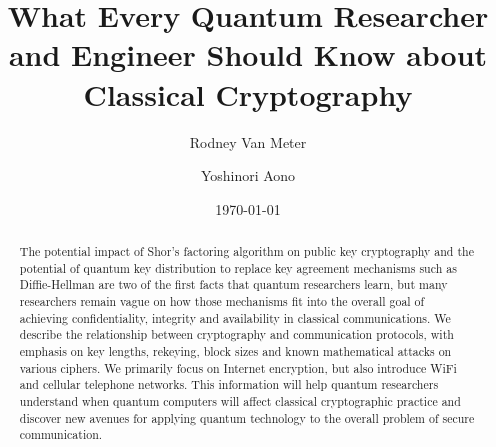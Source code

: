 \documentclass[%
 aip,
 jmp,%
 amsmath,amssymb,
 reprint,%
]{revtex4-1}
\def\comment#1{{\color{ForestGreen}$\Rightarrow${\small\em #1}}}
\begin{document}

\title[What Crypto]{What Every Quantum Researcher and Engineer Should Know about Classical Cryptography}%

\author{Rodney Van Meter}
%

\author{Yoshinori Aono}
%

\date{\today}%

\begin{abstract}
  The potential impact of Shor's factoring algorithm on public key
  cryptography and the potential of quantum key distribution to
  replace key agreement mechanisms such as Diffie-Hellman are two of
  the first facts that quantum researchers learn, but many researchers
  remain vague on how those mechanisms fit into the overall goal of
  achieving confidentiality, integrity and availability in classical
  communications.  We describe the relationship between cryptography
  and communication protocols, with emphasis on key lengths, rekeying,
  block sizes and known mathematical attacks on various ciphers.  We
  primarily focus on Internet encryption, but also introduce WiFi and
  cellular telephone networks.  This information will help quantum
  researchers understand when quantum computers will affect classical
  cryptographic practice and discover new avenues for applying quantum
  technology to the overall problem of secure communication.
%
\end{abstract}

\maketitle
\end{document}
